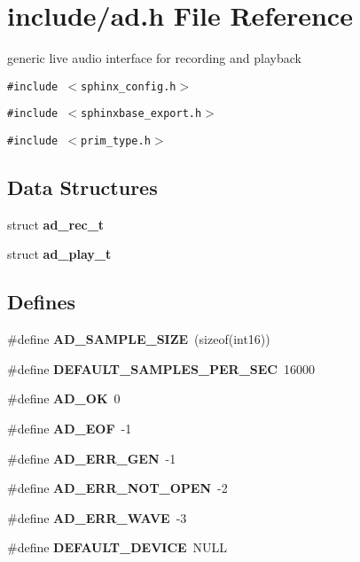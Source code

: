 \section{include/ad.h File Reference}
\label{ad_8h}
generic live audio interface for recording and playback  


{\tt \#include $<$sphinx\_\-config.h$>$}\par
{\tt \#include $<$sphinxbase\_\-export.h$>$}\par
{\tt \#include $<$prim\_\-type.h$>$}\par
\subsection*{Data Structures}
\begin{CompactItemize}
\item 
struct \textbf{ad\_\-rec\_\-t}
\item 
struct \textbf{ad\_\-play\_\-t}
\end{CompactItemize}
\subsection*{Defines}
\begin{CompactItemize}
\item 
\#define \textbf{AD\_\-SAMPLE\_\-SIZE}~(sizeof(int16))\label{ad_8h_21e7cf6f08592c2fa2f78eb069f0e161}

\item 
\#define \textbf{DEFAULT\_\-SAMPLES\_\-PER\_\-SEC}~16000\label{ad_8h_f6fb753bcfbd8dedec800ba4d0fb8546}

\item 
\#define \textbf{AD\_\-OK}~0\label{ad_8h_8d1358baba080a2f6b0d350928af7a89}

\item 
\#define \textbf{AD\_\-EOF}~-1\label{ad_8h_8aa969c2d485c3c17cf9abfd1bb88bdd}

\item 
\#define \textbf{AD\_\-ERR\_\-GEN}~-1\label{ad_8h_d75f71249c0e72e6867599af315fe27d}

\item 
\#define \textbf{AD\_\-ERR\_\-NOT\_\-OPEN}~-2\label{ad_8h_7ac31adbbd108d40792fc6ba3d14929f}

\item 
\#define \textbf{AD\_\-ERR\_\-WAVE}~-3\label{ad_8h_bdeca1c656c9ed4699402adb3556ae39}

\item 
\#define \textbf{DEFAULT\_\-DEVICE}~NULL\label{ad_8h_84cb8bbda8042a324f49102bc200cc54}

\end{CompactItemize}
